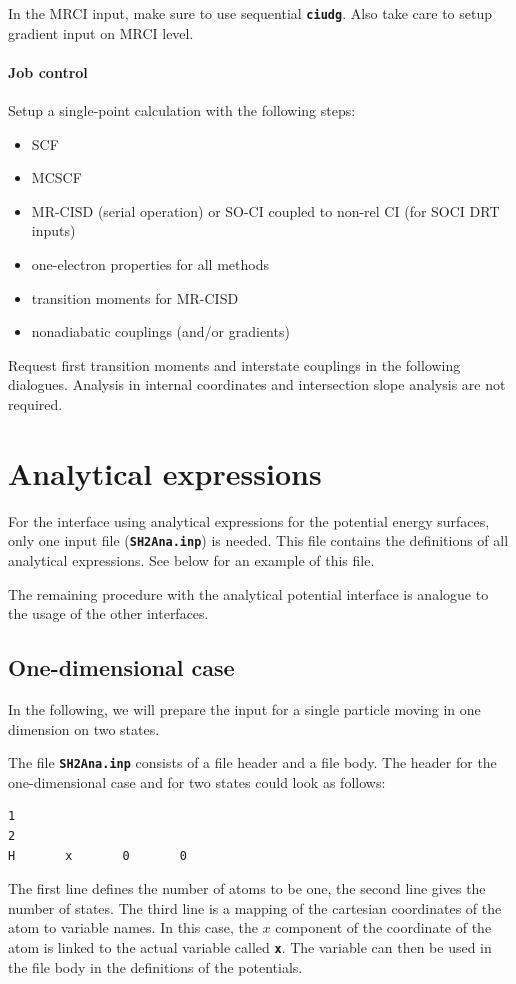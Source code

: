 \documentclass[a4paper,11pt,DIV=15,openany]{scrbook}
\newcommand{\ttt}[1]{\textbf{\texttt{#1}}}
\begin{document}
In the MRCI input, make sure to use sequential \ttt{ciudg}. Also take care to setup gradient input on MRCI level.

\paragraph{Job control}

Setup a single-point calculation with the following steps:
\begin{itemize}
  \item SCF
  \item MCSCF
  \item MR-CISD (serial operation) or SO-CI coupled to non-rel CI (for SOCI DRT inputs)
  \item one-electron properties for all methods
  \item transition moments for MR-CISD
  \item nonadiabatic couplings (and/or gradients)
\end{itemize}

Request first transition moments and interstate couplings in the following dialogues. Analysis in internal coordinates and intersection slope analysis are not required.



\section{Analytical expressions}

For the interface using analytical expressions for the potential energy surfaces, only one input file (\ttt{SH2Ana.inp}) is needed. This file contains the definitions of all analytical expressions. See below for an example of this file.

The remaining procedure with the analytical potential interface is analogue to the usage of the other interfaces.

\subsection{One-dimensional case}

In the following, we will prepare the input for a single particle moving in one dimension on two states.

The file \ttt{SH2Ana.inp} consists of a file header and a file body. The header for the one-dimensional case and for two states could look as follows:
\begin{oframed}
\footnotesize\begin{Verbatim}[commandchars=\\\{\}]
1
2
H       x       0       0
\end{Verbatim}
\end{oframed}
The first line defines the number of atoms to be one, the second line gives the number of states. The third line is a mapping of the cartesian coordinates of the atom to variable names. In this case, the $x$ component of the coordinate of the atom is linked to the actual variable called \ttt{x}. The variable can then be used in the file body in the definitions of the potentials.
\end{document}
